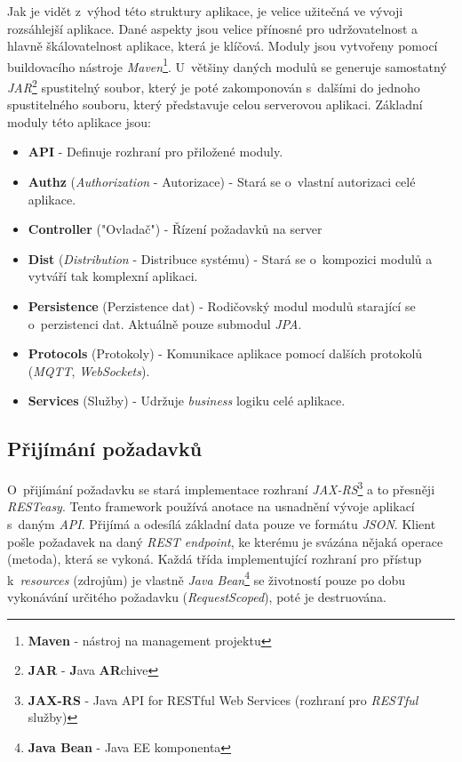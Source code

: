 Jak je vidět z~výhod této struktury aplikace, je velice užitečná ve vývoji rozsáhlejší aplikace.
Dané aspekty jsou velice přínosné pro udržovatelnost a hlavně škálovatelnost aplikace, která je klíčová.
Moduly jsou vytvořeny pomocí buildovacího nástroje \emph{Maven}\footnote{\textbf{Maven} - nástroj na management projektu}.
U~většiny daných modulů se generuje samostatný \emph{JAR}\footnote{\textbf{JAR} - \textbf{J}ava \textbf{AR}chive} spustitelný soubor,
který je poté zakomponován s~dalšími do jednoho spustitelného souboru, který představuje celou serverovou aplikaci.
\newline
Základní moduly této aplikace jsou:
\begin{itemize}
  \item \textbf{API} - Definuje rozhraní pro přiložené moduly.
  \item \textbf{Authz} (\emph{Authorization} - Autorizace) - Stará se o~vlastní autorizaci celé aplikace.
  \item \textbf{Controller} ("Ovladač") - Řízení požadavků na server
  \item \textbf{Dist} (\emph{Distribution} - Distribuce systému) - Stará se o~kompozici modulů a vytváří tak komplexní aplikaci.
  \item \textbf{Persistence} (Perzistence dat) - Rodičovský modul modulů starající se o~perzistenci dat. Aktuálně pouze submodul \emph{JPA}.
  \item \textbf{Protocols} (Protokoly) - Komunikace aplikace pomocí dalších protokolů (\emph{MQTT}, \emph{WebSockets}).
  \item \textbf{Services} (Služby) - Udržuje \emph{business} logiku celé aplikace.
\end{itemize}

\newpage
\subsection*{Přijímání požadavků}
\label{impl:backend:request}
O~přijímání požadavku se stará implementace rozhraní \emph{JAX-RS}\footnote{\textbf{JAX-RS} - Java API for RESTful Web Services (rozhraní pro \emph{RESTful} služby)} a to přesněji \emph{RESTeasy}.
Tento framework používá anotace na usnadnění vývoje aplikací s~daným \emph{API}.
Přijímá a odesílá základní data pouze ve formátu \emph{JSON}.
Klient pošle požadavek na daný \emph{REST endpoint}, ke kterému je svázána nějaká operace (metoda), která se vykoná.
Každá třída implementující rozhraní pro přístup k~\emph{resources} (zdrojům) je vlastně \emph{Java Bean}\footnote{\textbf{Java Bean} - Java EE komponenta} se životností pouze po dobu vykonávání určitého požadavku (\emph{RequestScoped}), poté je destruována.

